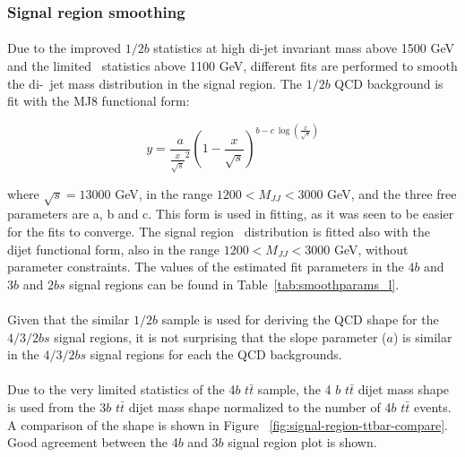 \subsubsection{Signal region smoothing}
\label{sec:boosted-SR-smoothing}

\paragraph{}
Due to the improved $1/2b$ statistics at high di-\largeR jet invariant mass above 1500 GeV and the limited \ttbar\ statistics above 1100 GeV, different fits are performed to smooth the di-\largeR\ jet mass distribution in the signal region. The $1/2b$ QCD background is fit with the MJ8 functional form:

\begin{equation}
\label{eq:boosted_dijet}
y = \frac{a}{\frac{x}{\sqrt{s}}^2} (1-\frac{x}{\sqrt{s}})^{b - c\ \log(\frac{x}{\sqrt{s}})}
\end{equation}

where $\sqrt{s} = 13000$ GeV, in the range $1200 < M_{JJ} < 3000$ GeV, and the three free parameters are a, b and c. This form is used in fitting, as it was seen to be easier for the fits to converge.  The signal region \ttbar\ distribution is fitted also with the dijet functional form, also in the range $1200 < M_{JJ} < 3000$ GeV, without parameter constraints. The values of the estimated fit parameters in the $4b$ and $3b$ and $2bs$ signal regions can be found in Table~\ref{tab:smoothparams_l}.

\paragraph{}
Given that the similar $1/2b$ sample is used for deriving the QCD shape for the $4/3/2bs$  signal regions, it is not surprising that the slope parameter ($a$) is similar in  the  $4/3/2bs$  signal regions for each the QCD backgrounds.

\paragraph{}
Due to the very limited statistics of the 4$b$ $t\bar{t}$ sample, the 4 $b$ $t\bar{t}$ dijet mass shape is used from the 3$b$ $t\bar{t}$ dijet mass shape normalized to the number of 4$b$ $t\bar{t}$ events. A comparison of the shape is shown in Figure ~\ref{fig:signal-region-ttbar-compare}. Good agreement between the 4$b$ and 3$b$ signal region plot is shown.

